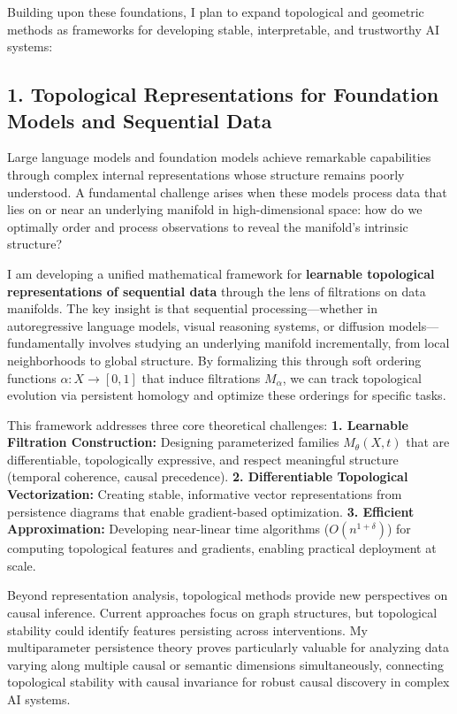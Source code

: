 \documentclass[11pt,letterpaper]{article}
\begin{document}
Building upon these foundations, I plan to expand topological and geometric methods as frameworks for developing stable, interpretable, and trustworthy AI systems:

\subsection*{1. Topological Representations for Foundation Models and Sequential Data}

Large language models and foundation models achieve remarkable capabilities through complex internal representations whose structure remains poorly understood. A fundamental challenge arises when these models process data that lies on or near an underlying manifold in high-dimensional space: how do we optimally order and process observations to reveal the manifold's intrinsic structure?

I am developing a unified mathematical framework for \textbf{learnable topological representations of sequential data} through the lens of filtrations on data manifolds. The key insight is that sequential processing—whether in autoregressive language models, visual reasoning systems, or diffusion models—fundamentally involves studying an underlying manifold incrementally, from local neighborhoods to global structure. By formalizing this through soft ordering functions $\alpha: X \to [0,1]$ that induce filtrations $M_\alpha$, we can track topological evolution via persistent homology and optimize these orderings for specific tasks.

This framework addresses three core theoretical challenges:
\textbf{1. Learnable Filtration Construction:} Designing parameterized families $M_\theta(X,t)$ that are differentiable, topologically expressive, and respect meaningful structure (temporal coherence, causal precedence).
\textbf{2. Differentiable Topological Vectorization:} Creating stable, informative vector representations from persistence diagrams that enable gradient-based optimization.
\textbf{3. Efficient Approximation:} Developing near-linear time algorithms ($O(n^{1+\delta})$) for computing topological features and gradients, enabling practical deployment at scale.


Beyond representation analysis, topological methods provide new perspectives on causal inference. Current approaches focus on graph structures, but topological stability could identify features persisting across interventions. My multiparameter persistence theory proves particularly valuable for analyzing data varying along multiple causal or semantic dimensions simultaneously, connecting topological stability with causal invariance for robust causal discovery in complex AI systems.
\end{document}
